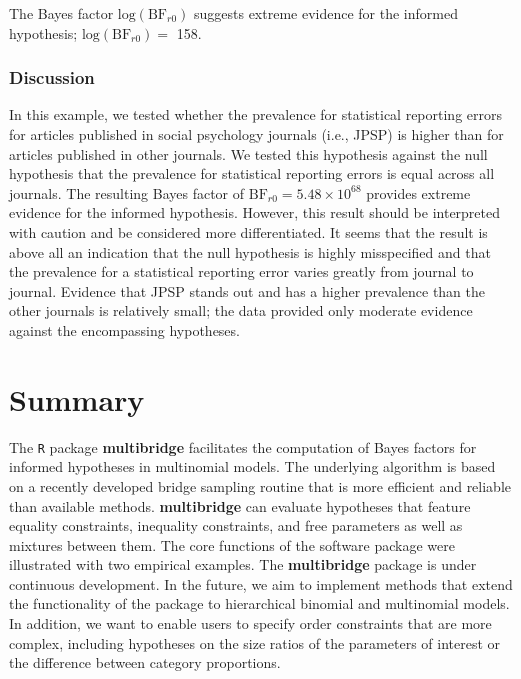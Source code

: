 \documentclass[
  english,
  man,floatsintext]{apa6}
\newenvironment{Shaded}{\begin{snugshade}}{\end{snugshade}}
\newcommand{\NormalTok}[1]{#1}
\newcommand{\OperatorTok}[1]{\textcolor[rgb]{0.81,0.36,0.00}{\textbf{#1}}}
\newcommand{\StringTok}[1]{\textcolor[rgb]{0.31,0.60,0.02}{#1}}
\begin{document}
\begin{Shaded}
\end{Shaded}

The Bayes factor \(\text{log}(\text{BF}_{r0})\) suggests extreme evidence for the informed hypothesis; \(\text{log}(\text{BF}_{r0}) =\) 158.

\hypertarget{discussion-1}{%
\subsubsection{Discussion}\label{discussion-1}}

In this example, we tested whether the prevalence for statistical reporting errors for articles published in social psychology journals (i.e., JPSP) is higher than for articles published in other journals. We tested this hypothesis against the null hypothesis that the prevalence for statistical reporting errors is equal across all journals. The resulting Bayes factor of \(\text{BF}_{r0} = 5.48 \times 10^{68}\) provides extreme evidence for the informed hypothesis. However, this result should be interpreted with caution and be considered more differentiated. It seems that the result is above all an indication that the null hypothesis is highly misspecified and that the prevalence for a statistical reporting error varies greatly from journal to journal. Evidence that JPSP stands out and has a higher prevalence than the other journals is relatively small; the data provided only moderate evidence against the encompassing hypotheses.

\hypertarget{summary}{%
\section{Summary}\label{summary}}

The \texttt{R} package \textbf{multibridge} facilitates the computation of Bayes factors for informed hypotheses in multinomial models. The underlying algorithm is based on a recently developed bridge sampling routine that is more efficient and reliable than available methods. \textbf{multibridge} can evaluate hypotheses that feature equality constraints, inequality constraints, and free parameters as well as mixtures between them. The core functions of the software package were illustrated with two empirical examples. The \textbf{multibridge} package is under continuous development. In the future, we aim to implement methods that extend the functionality of the package to hierarchical binomial and multinomial models. In addition, we want to enable users to specify order constraints that are more complex, including hypotheses on the size ratios of the parameters of interest or the difference between category proportions.
\end{document}
